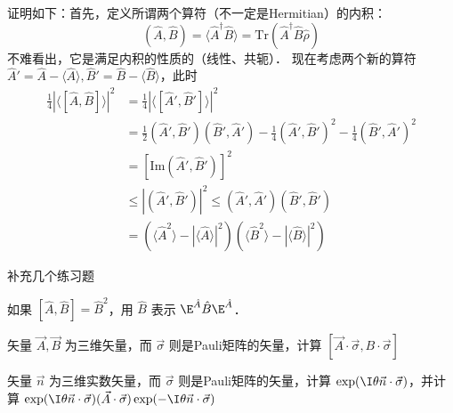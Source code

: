 证明如下：首先，定义所谓两个算符（不一定是Hermitian）的内积：
\begin{equation}
(\hat A, \hat B)=\langle\hat A^\dagger\hat B\rangle = \text{Tr}(\hat A^\dagger\hat B\hat\rho)
\end{equation}
不难看出，它是满足内积的性质的（线性、共轭）．
现在考虑两个新的算符 $\hat A'=\hat A-\langle\hat A\rangle, \hat B'=\hat B-\langle\hat B\rangle$，此时
\begin{equation}
\begin{split}
\frac{1}{4}|\langle[\hat A,\hat B]\rangle|^2&=\frac{1}{4}|\langle[\hat A',\hat B']\rangle|^2 \\
&=\frac{1}{2}(\hat A',\hat B')(\hat B',\hat A')-\frac{1}{4}(\hat A',\hat B')^2-\frac{1}{4}(\hat B',\hat A')^2\\
&=[\text{Im}(\hat A',\hat B')]^2\\
&\le |(\hat A',\hat B')|^2\le(\hat A',\hat A')(\hat B',\hat B')\\
&=(\langle\hat A^2\rangle - |\langle\hat A\rangle|^2)(\langle\hat B^2\rangle - |\langle\hat B\rangle|^2)
\end{split}
\end{equation}

补充几个练习题

\begin{exer}{}
如果 $[\hat A,\hat B]=\hat B^2$，用 $\hat B$ 表示 $\E^{\hat A}\hat B \E^{\hat A}$．
\end{exer}

\begin{exer}{}
矢量 $\vec A, \vec B$ 为三维矢量，而 $\vec{\sigma}$ 则是Pauli矩阵的矢量，计算 $[\vec A\cdot\vec{\sigma}, B\cdot\vec{\sigma}]$
\end{exer}{}

\begin{exer}{}
矢量 $\vec n$ 为三维实数矢量，而 $\vec{\sigma}$ 则是Pauli矩阵的矢量，计算 $\exp(\I\theta\vec n\cdot\vec{\sigma})$，并计算 $\exp(\I\theta\vec n\cdot\vec{\sigma})(\vec A\cdot\vec{\sigma})\exp(-\I\theta\vec n\cdot\vec{\sigma})$
\end{exer}